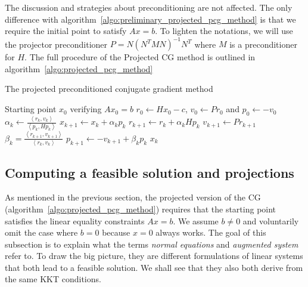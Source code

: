 \documentclass[10pt]{article}
\numberwithin{equation}{section}
\newcommand{\scal}[2]{\left\langle {#1} , {#2} \right\rangle} %
\begin{document}
	 The discussion and strategies about preconditioning are not affected. The only difference with algorithm~\eqref{algo:preliminary_projected_pcg_method} is that we require the initial point to satisfy $Ax=b$. To lighten the notations, we will use the projector preconditioner $P= N(N^TMN)^{-1}N^T$ where $M$ is a preconditioner for $H$. The full procedure of the Projected CG method is outlined in algorithm~\ref{algo:projected_pcg_method} 
	 
	 \begin{algorithm}
	 	\caption{The projected preconditioned conjugate gradient method}\label{algo:projected_pcg_method}
	 	\begin{algorithmic}
	 		\Require Starting point $x_0$ verifying $Ax_0=b$
	 		\State $r_0 \gets Hx_0-c$, $v_0\gets Pr_0$ and $p_0 \gets -v_0$
	 		\State $\alpha_k \gets \frac{\scal{r_k}{v_k}}{\scal{p_k}{Hp_k}}$
	 		\State $x_{k+1} \gets x_k+\alpha_kp_k$
	 		\State $r_{k+1} \gets r_k + \alpha_kHp_k$
	 		\State $v_{k+1}\gets Pr_{k+1}$
	 		\State $\beta_k =  \frac{\scal{r_{k+1}}{v_{k+1}}}{\scal{r_k}{v_k}}$
	 		\State $p_{k+1} \gets -v_{k+1}+\beta_kp_k$
	 		\EndFor{}
	 		\Return $x_k$
	 	\end{algorithmic}
	 \end{algorithm} 
	 
	 \subsection{Computing a feasible solution and projections}\label{subsec:cg_feasible_solution}
	 
	 As mentioned in the previous section, the projected version of the CG (algorithm~\ref{algo:projected_pcg_method}) requires that the starting point satisfies the linear equality constraints $Ax=b$. We assume $b\neq0$ and voluntarily omit the case where $b=0$ because $x=0$ always works. The goal of this subsection is to explain what the terms \textit{normal equations} and \textit{augmented system} refer to. To draw the big picture, they are different formulations of linear systems that both lead to a feasible solution. We shall see that they also both derive from the same KKT conditions.
	 
\end{document}
